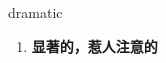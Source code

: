 
\begin{frame}
{\huge dramatic}
\begin{center}
\begin{enumerate}\Large
  \item \textbf{显著的，惹人注意的}
\end{enumerate}
\end{center}
\end{frame}
